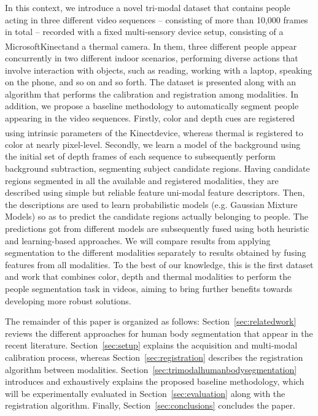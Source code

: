 \documentclass[10pt,twocolumn,letterpaper]{article}
\begin{document}
In this context, we introduce a novel tri-modal dataset that contains people acting in three different video sequences -- consisting of more than 10,000 frames in total -- recorded with a fixed multi-sensory device setup, consisting of a Microsoft\textsuperscript\textregistered Kinect\textsuperscript\texttrademark and a thermal camera. In them, three different people appear concurrently in two different indoor scenarios, performing diverse actions that involve interaction with objects, such as reading, working with a laptop, speaking on the phone, and so on and so forth. The dataset is presented along with an algorithm that performs the calibration and registration among modalities. In addition, we propose a baseline methodology to automatically segment people appearing in the video sequences. Firstly, color and depth cues are registered using intrinsic parameters of the Kinect\textsuperscript\texttrademark device, whereas thermal is registered to color at nearly pixel-level. Secondly, we learn a model of the background using the initial set of depth frames of each sequence to subsequently perform background subtraction, segmenting subject candidate regions. Having candidate regions segmented in all the available and registered modalities, they are described using simple but reliable feature uni-modal feature descriptors. Then, the descriptions are used to learn probabilistic models (e.g. Gaussian Mixture Models) so as to predict the candidate regions actually belonging to people. The predictions got from different models are subsequently fused using both heuristic and learning-based approaches. We will compare results from applying segmentation to the different modalities separately to results obtained by fusing features from all modalities. To the best of our knowledge, this is the first dataset and work that combines color, depth and thermal modalities to perform the people segmentation task in videos, aiming to bring further benefits towards developing more robust solutions.

The remainder of this paper is organized as follows: Section~\ref{sec:relatedwork} reviews the different approaches for human body segmentation that appear in the recent literature. Section~\ref{sec:setup} explains the acquisition and multi-modal calibration process, whereas Section~\ref{sec:registration} describes the registration algorithm between modalities. Section~\ref{sec:trimodalhumanbodysegmentation} introduces and exhaustively explains the proposed baseline methodology, which will be experimentally evaluated in Section~\ref{sec:evaluation} along with the registration algorithm. Finally, Section~\ref{sec:conclusions} concludes the paper.
\end{document}
